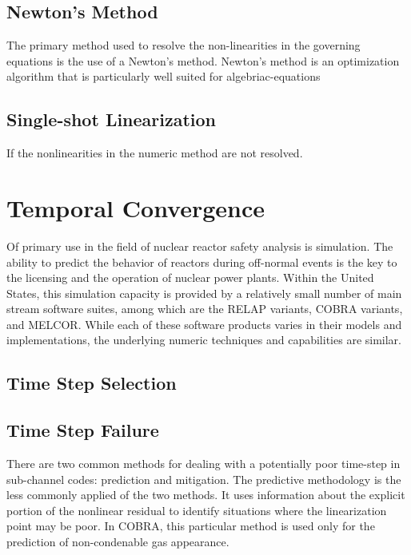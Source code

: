 \subsection{Newton's Method}
\label{subsect:newtons_method}
The primary method used to resolve the non-linearities in the governing equations is the use of a Newton's method.
Newton's method is an optimization algorithm that is particularly well suited for algebriac-equations

\subsection{Single-shot Linearization}
\label{subsect:single_shot}
If the nonlinearities in the numeric method are not resolved.

\section{Temporal Convergence}
\label{sect:temporal_convergence}
Of primary use in the field of nuclear reactor safety analysis is simulation.
The ability to predict the behavior of reactors during off-normal events is the key to the licensing and the operation of nuclear power plants.
Within the United States, this simulation capacity is provided by a relatively small number of main stream software suites, among which are the RELAP variants, COBRA variants, and MELCOR.
While each of these software products varies in their models and implementations, the underlying numeric techniques and capabilities are similar.

\subsection{Time Step Selection}
\label{subsect:time_step_selection}

\subsection{Time Step Failure}
\label{subsect:time_step_failure}
There are two common methods for dealing with a potentially poor time-step in sub-channel codes: prediction and mitigation.
The predictive methodology is the less commonly applied of the two methods.
It uses information about the explicit portion of the nonlinear residual to identify situations where the linearization point may be poor.
In COBRA, this particular method is used only for the prediction of non-condenable gas appearance.

